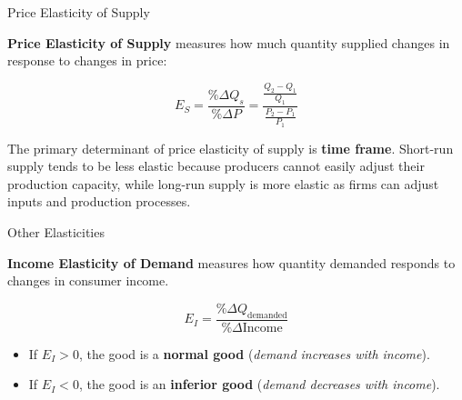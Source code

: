 \documentclass[10pt]{article}
\begin{document}
    \begin{core}{Price Elasticity of Supply}

      \textbf{Price Elasticity of Supply} measures how much quantity supplied changes in response to changes in price:

      \[
        E_S = \frac{\%\Delta Q_s}{\%\Delta P} = \frac{\frac{Q_2 - Q_1}{Q_1}}{\frac{P_2 - P_1}{P_1}}
      \]

      The primary determinant of price elasticity of supply is \textbf{time frame}. Short-run supply tends to be less elastic because producers cannot easily adjust their production capacity, while long-run supply is more elastic as firms can adjust inputs and production processes.

    \end{core}

    \begin{core}{Other Elasticities}

      \textbf{Income Elasticity of Demand} measures how quantity demanded responds to changes in consumer income.

      \[
        E_I = \frac{\%\Delta Q_{\text{demanded}}}{\%\Delta \text{Income}}
      \]

      \begin{itemize}

        \item If $E_I > 0$, the good is a \textbf{normal good} (\textit{demand increases with income}).

        \item If $E_I < 0$, the good is an \textbf{inferior good} (\textit{demand decreases with income}).

      \end{itemize}



\end{core}
\end{document}
